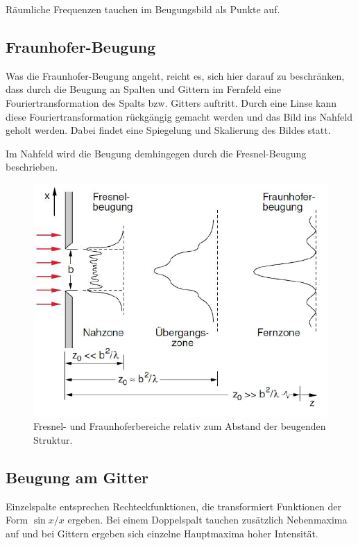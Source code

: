 \documentclass[
	a4paper,
	12pt,
	pagesize,
	ngerman
]{scrartcl}
\begin{document}
	Räumliche Frequenzen tauchen im Beugungsbild als Punkte auf.

	\subsection{Fraunhofer-Beugung}
	\label{sec_fraunhofer}

	Was die Fraunhofer-Beugung angeht, reicht es, sich hier darauf zu beschränken, dass durch die Beugung an Spalten und Gittern im Fernfeld eine Fouriertransformation des Spalts bzw. Gitters auftritt.
	Durch eine Linse kann diese Fouriertransformation rückgängig gemacht werden und das Bild ins Nahfeld geholt werden.
	Dabei findet eine Spiegelung und Skalierung des Bildes statt.

	Im Nahfeld wird die Beugung demhingegen durch die Fresnel-Beugung beschrieben.

	\begin{figure}[H]
			\includegraphics[width=1\linewidth]{img/fraunfresnel}
			\caption{
				Fresnel- und Fraunhoferbereiche relativ zum Abstand der beugenden Struktur. \cite{Anleitung}
			}
			\label{fig_fraunfresnel}
	\end{figure}

	\subsection{Beugung am Gitter}
	\label{sec_gitterbeug}

	Einzelspalte entsprechen Rechteckfunktionen, die transformiert Funktionen der Form $\sin{x}/x$ ergeben.
	Bei einem Doppelspalt tauchen zusätzlich Nebenmaxima auf und bei Gittern ergeben sich einzelne Hauptmaxima hoher Intensität.
\end{document}
